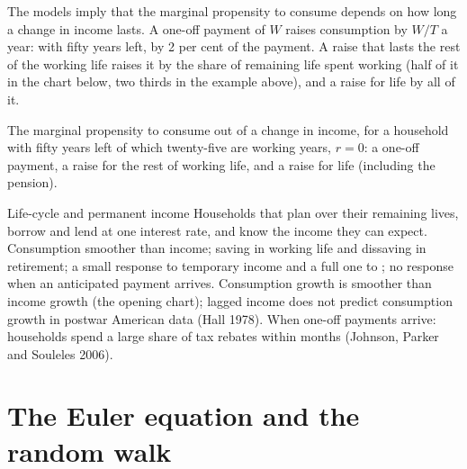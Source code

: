 The models imply that the marginal propensity to consume depends on how long a change in income lasts. A one-off payment
of $W$ raises consumption by $W/T$ a year: with fifty years left, by 2 per cent of the payment. A raise that lasts the rest of the
working life raises it by the share of remaining life spent working (half of it in the chart below, two thirds in the
example above), and a raise for life by all of it.

\begin{omfigure}

{\small The marginal propensity to consume out of a change in income, for a household with fifty years left of which
twenty-five are working years, $r = 0$: a one-off payment, a raise for the rest of working life, and a raise for life
(including the pension).}
\end{omfigure}

\begin{model}{Life-cycle and permanent income}
\assumes Households that plan over their remaining lives, borrow and lend at one interest rate, and know the income they
can expect.
\predicts Consumption smoother than income; saving in working life and dissaving in retirement; a small response to
temporary income and a full one to ; no response when an anticipated payment arrives.
\tested Consumption growth is smoother than income growth (the opening chart); lagged income does not predict consumption
growth in postwar American data (Hall 1978).
\breaks When one-off payments arrive: households spend a large share of tax rebates within months (Johnson, Parker and
Souleles 2006).
\end{model}

\section{The Euler equation and the random walk}\label{sec:b2:consumption:random-walk}

